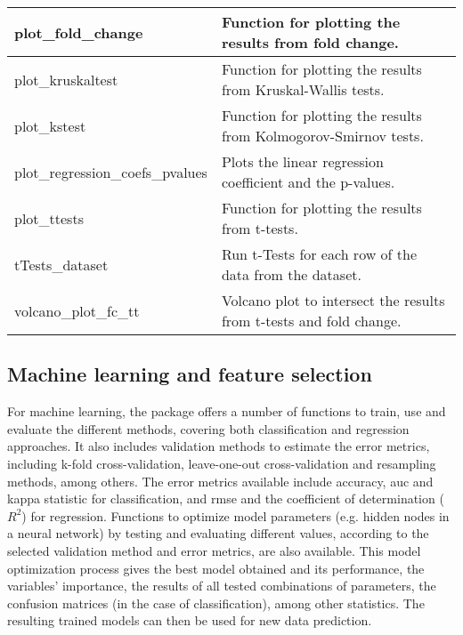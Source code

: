 \begin{scriptsize}
\begin{longtable}{|m{4.3cm}|m{11cm}|}
		\hline
		plot\_fold\_change & Function for plotting the results from fold change. \\
		
		\hline
		plot\_kruskaltest & Function for plotting the results from Kruskal-Wallis tests. \\
		
		\hline
		plot\_kstest & Function for plotting the results from Kolmogorov-Smirnov tests. \\
		
		\hline
		plot\_regression\_coefs\_pvalues & Plots the linear regression coefficient and the p-values. \\
		
		\hline
		plot\_ttests & Function for plotting the results from t-tests. \\
		
		\hline
		tTests\_dataset & Run t-Tests for each row of the data from the dataset. \\
		
		\hline
		volcano\_plot\_fc\_tt & Volcano plot to intersect the results from t-tests and fold change. \\
		
		\hline
		
	\end{longtable}
\end{scriptsize}


\subsection{Machine learning and feature selection}

For machine learning, the package offers a number of functions to train, use and evaluate the different methods, covering both classification and regression approaches. It also includes validation methods to estimate the error metrics, including k-fold cross-validation, leave-one-out cross-validation and resampling methods, among others. The error metrics available include accuracy, \gls{auc} and kappa statistic for classification, and \gls{rmse} and the coefficient of determination ($ R^{2} $) for regression. Functions to optimize model parameters (e.g. hidden nodes in a neural network) by testing and evaluating different values, according to the selected validation method and error metrics, are also available. This model optimization process gives the best model obtained and its performance, the variables’ importance, the results of all tested combinations of parameters, the confusion matrices (in the case of classification), among other statistics. The resulting trained models can then be used for new data prediction.

